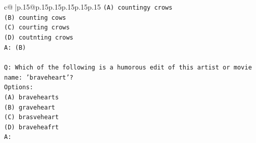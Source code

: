 \documentclass{article}
\begin{document}
{\begin{supertabular}{c@{$\;$}|p{.15\linewidth}@{}p{.15\linewidth}p{.15\linewidth}p{.15\linewidth}p{.15\linewidth}p{.15\linewidth}}
{{{\texttt{(A) countingy crows} \\
\texttt{(B) counting cows} \\
\texttt{(C) courting crows} \\
\texttt{(D) coutnting crows} \\
\texttt{A: (B)} \\
\\ 
\texttt{Q: Which of the following is a humorous edit of this artist or movie name: 'braveheart'?} \\
\texttt{Options:} \\
\texttt{(A) bravehearts} \\
\texttt{(B) graveheart} \\
\texttt{(C) brasveheart} \\
\texttt{(D) braveheafrt} \\
\texttt{A:} \\
            }
        }
    }
     \\ \\


\end{supertabular}}
\end{document}
